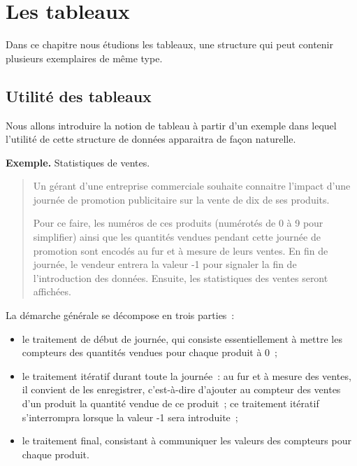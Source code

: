 \chapter{Les tableaux}

	Dans ce chapitre nous étudions les tableaux, une structure qui peut contenir
	plusieurs exemplaires de même type.

	\minitoc
	\clearpage
	\section{Utilité des tableaux}
	
		Nous allons introduire la notion de tableau à partir d’un exemple 
		dans lequel l’utilité de cette structure de données 
		apparaitra de façon naturelle.
	
		\textbf{Exemple.}
		Statistiques de ventes.
		\begin{quote}	
		
			Un gérant d’une entreprise commerciale souhaite connaitre l’impact
			d’une journée de promotion publicitaire sur la vente de dix de ses
			produits.  
			
			Pour ce faire, les numéros de ces produits (numérotés de
			0 à 9 pour simplifier) ainsi que les quantités vendues pendant cette
			journée de promotion sont encodés au fur et à mesure de leurs
			ventes.  En fin de journée, le vendeur entrera la valeur -1 pour
			signaler la fin de l’introduction des données.  Ensuite, les
			statistiques des ventes seront affichées.
		
		\end{quote}

		La démarche générale se décompose en trois parties~:
		\begin{itemize}
		
			\item le traitement de début de journée, qui consiste
				essentiellement à mettre les compteurs des quantités vendues
				pour chaque produit à 0~;
		
			\item le traitement itératif durant toute la journée~: au fur et
				à mesure des ventes, il convient de les enregistrer,
				c’est-à-dire d’ajouter au compteur des ventes d’un produit la
				quantité vendue de ce produit~; ce traitement itératif
				s’interrompra lorsque la valeur -1 sera introduite~;
		
			\item le traitement final, consistant à communiquer les valeurs des
				compteurs pour chaque produit.
		
	\end{itemize}
	
